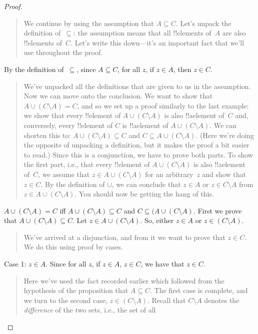 \documentclass[../../../include/open-logic-section]{subfiles}
\begin{document}
\begin{proof}
\begin{quote}
    We continue by using the assumption that $A \subseteq C$. Let's
    unpack the definition of~$\subseteq$: the assumption means that
    all !!{element}s of~$A$ are also !!{element}s of~$C$. Let's write
    this down---it's an important fact that we'll use throughout the
    proof.
  \end{quote}
  By the definition of~$\subseteq$, since $A \subseteq C$, for all
  $z$, if $z \in A$, then $z \in C$.
  \begin{quote}
    We've unpacked all the definitions that are given to us in the
    assumption. Now we can move onto the conclusion. We want to show
    that $A \cup (C \setminus A) = C$, and so we set up a proof
    similarly to the last example: we show that every !!{element} of
    $A \cup (C \setminus A)$ is also !!a{element} of~$C$ and,
    conversely, every !!{element} of $C$ is !!a{element} of $A \cup (C
    \setminus A)$. We can shorten this to: $A \cup (C \setminus A)
    \subseteq C$ and $C \subseteq A \cup (C \setminus A)$. (Here we're
    doing the opposite of unpacking a definition, but it makes the
    proof a bit easier to read.)  Since this is a conjunction, we have
    to prove both parts. To show the first part, i.e., that every
    !!{element} of $A \cup (C \setminus A)$ is also !!a{element}
    of~$C$, we assume that $z \in A \cup (C \setminus A)$ for an
    arbitrary~$z$ and show that $z \in C$. By the definition of
    $\cup$, we can conclude that $z \in A$ or $z \in C \setminus A$
    from $z \in A \cup (C \setminus A)$. You should now be getting the
    hang of this.
    \end{quote}
  $A \cup (C \setminus A) = C$ iff $A \cup (C \setminus A) \subseteq
  C$ and $C \subseteq (A \cup (C \setminus A)$.  First we prove that
  $A \cup (C \setminus A) \subseteq C$.  Let $z \in A \cup (C
  \setminus A)$. So, either $z \in A$ or $z \in (C \setminus A)$.
  \begin{quote}
    We've arrived at a disjunction, and from it we want to prove that
    $z \in C$. We do this using proof by cases.
  \end{quote}
  Case 1: $z \in A$. Since for all $z$, if $z \in A$, $z \in C$, we
  have that $z \in C$.
  \begin{quote}
    Here we've used the fact recorded earlier which followed from the
    hypothesis of the proposition that $A \subseteq C$.  The first
    case is complete, and we turn to the second case, $z \in (C
    \setminus A)$.  Recall that $C \setminus A$ denotes the
    \emph{difference} of the two sets, i.e., the set of all

\end{quote}
\end{proof}
\end{document}
